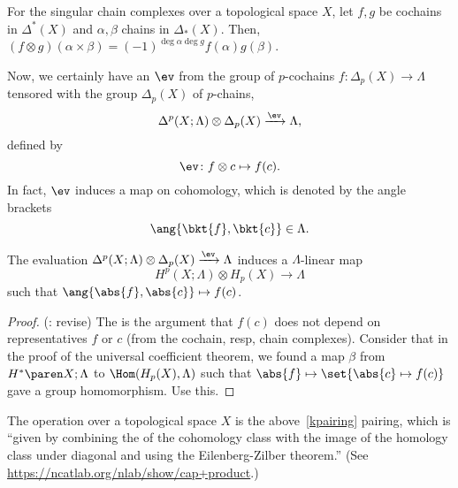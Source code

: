 \begin{coro}
    For the singular chain complexes over a topological space $X$, let $f, g$ be cochains in $\Delta^*(X)$ and $\alpha, \beta$ chains in $\Delta_*(X)$. 
    Then, $(f\otimes g)(\alpha \times \beta) = (-1)^{\deg \alpha \deg g} f(\alpha)g(\beta)$.
\end{coro}

Now, we certainly have an  $\ev$ from the group of $p$-cochains $f \colon \Delta_p(X) \to \Lambda$ tensored with the group $\Delta_p(X)$ of $p$-chains,
\[
    \Delta^p(X; \Lambda) \otimes \Delta_p(X) \xrightarrow{\ev} \Lambda,
\]
defined by
\[
    \ev\colon f \otimes c \mapsto f(c).
\] 
In fact, $\ev$ induces a map on cohomology, which is denoted by the angle brackets
\[
    \ang{\bkt{f}, \bkt{c}} \in \Lambda.
\]

\begin{lem}
   The evaluation $\Delta^p(X; \Lambda) \otimes \Delta_p(X) \xrightarrow{\ev} \Lambda$ induces a $\Lambda$-linear map
   \begin{equation}
       \label{kpairing}
       H^p(X;\Lambda) \otimes H_p(X) \to \Lambda
   \end{equation}
   such that $\ang{\abs{f}, \abs{ c }}\mapsto f(c)$.
\end{lem}

\begin{proof}
    (\TODO: revise) The  is the argument that $f(c)$ does not depend on representatives $f$ or $c$ (from the cochain, resp, chain complexes). Consider that in the proof of the universal coefficient theorem, we found a map $\beta$ from $\coho{X}{\Lambda}$ to $\Hom(H_p(X), \Lambda)$ such that $\abs{f} \mapsto \set{ \abs{c} \mapsto f(c) }$ gave a group homomorphism. Use this.
\end{proof}

\begin{rem}
    The  operation over a topological space $X$ is the above~\eqref{kpairing} pairing, which is ``given by combining the  of the cohomology class with the image of the homology class under diagonal and using the Eilenberg-Zilber theorem.'' (See \url{https://ncatlab.org/nlab/show/cap+product}.)
\end{rem}

